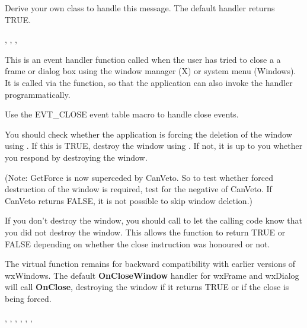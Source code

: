 Derive your own class to handle this message. The default handler returns TRUE.


,\rtfsp
{},\rtfsp
{},\rtfsp
{}

\label{wxwindowonclosewindow}


This is an event handler function called when the user has tried to close a a frame
or dialog box using the window manager (X) or system menu (Windows). It is
called via the  function, so
that the application can also invoke the handler programmatically.

Use the EVT\_CLOSE event table macro to handle close events.

You should check whether the application is forcing the deletion of the window
using . If this is TRUE,
destroy the window using .
If not, it is up to you whether you respond by destroying the window.

(Note: GetForce is now superceded by CanVeto. So to test whether forced destruction of
the window is required, test for the negative of CanVeto. If CanVeto returns FALSE,
it is not possible to skip window deletion.)

If you don't destroy the window, you should call  to
let the calling code know that you did not destroy the window. This allows the  function
to return TRUE or FALSE depending on whether the close instruction was honoured or not.


The  virtual function remains
for backward compatibility with earlier versions of wxWindows. The
default {\bf OnCloseWindow} handler for wxFrame and wxDialog will call {\bf OnClose},
destroying the window if it returns TRUE or if the close is being forced.


,\rtfsp
{},\rtfsp
{},\rtfsp
{},\rtfsp
{},\rtfsp
{},\rtfsp
{}

